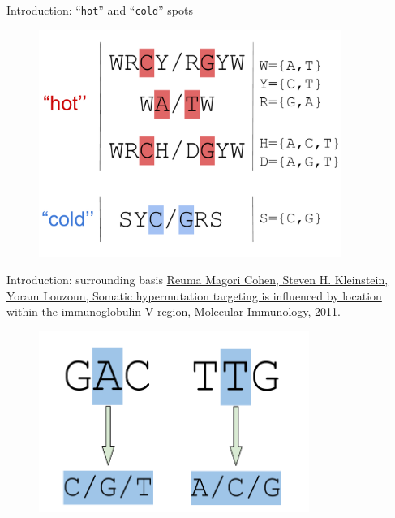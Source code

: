 \documentclass{beamer}\usepackage[]{graphicx}\usepackage[]{color}
\begin{document}
\begin{frame}{Introduction: ``\texttt{hot}'' and ``\texttt{cold}'' spots}
  \begin{figure}[h]
    \center\includegraphics[width=280pt]{Pictures/Hot_and_cold_spots.pdf}
 \end{figure}
\end{frame}

\begin{frame}{Introduction: surrounding basis}
    \href{http://www.sciencedirect.com/science/article/pii/S0161589011001192}{
    Reuma Magori Cohen, Steven H. Kleinstein, Yoram Louzoun, Somatic hypermutation targeting is influenced by location within the immunoglobulin V region, Molecular Immunology, 2011.}
  \begin{figure}[h]
    \center\includegraphics[width=250pt]{Pictures/three_surround.pdf}
 \end{figure}
\end{frame}
\end{document}
